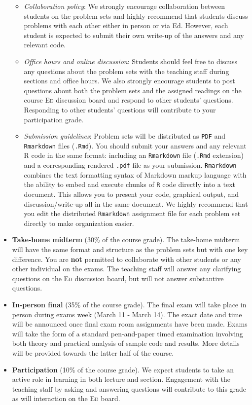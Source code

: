 \documentclass[11pt, article, oneside]{memoir}
\theoremstyle{Assumption}
\begin{document}
\begin{itemize}
\begin{itemize}
       \item \textit{Collaboration policy}: We strongly encourage collaboration between students on the problem sets and highly recommend that students discuss problems with each other either in person or via Ed. However, each student is expected to submit their own write-up of the answers and any relevant code. 
        \item \textit{Office hours and online discussion}: Students should feel free to discuss any questions about the problem sets with the teaching staff during sections and office hours. We also strongly encourage students to post questions about both the problem sets and the assigned readings on the course \textsc{Ed} discussion board and respond to other students’ questions. Responding to other students’ questions will contribute to your participation grade.
        \item \textit{Submission guidelines}: Problem sets will be distributed as \texttt{PDF} and \texttt{Rmarkdown} files (\texttt{.Rmd}). You should submit your answers and any relevant R code in the same format: including an \texttt{Rmarkdown} file (\texttt{.Rmd} extension) and a corresponding rendered \texttt{.pdf} file as your submission. \texttt{Rmarkdown} combines the text formatting syntax of Markdown markup language with the ability to embed and execute chunks of \texttt{R} code directly into a text document. This allows you to present your code, graphical output, and discussion/write-up all in the same document. We highly recommend that you edit the distributed \texttt{Rmarkdown} assignment file for each problem set directly to make organization easier.
        \end{itemize}
\item  \textbf{Take-home midterm} (30\% of the course grade). The take-home midterm will have the same format and structure as the problem sets but with one key difference. You are \textbf{not} permitted to collaborate with other students or any other individual on the exams. The teaching staff will answer any clarifying questions on the \textsc{Ed} discussion board, but will not answer substantive questions.
\item \textbf{In-person final} (35\% of the course grade). The final exam will take place in person during exams week (March 11 - March 14). The exact date and time will be announced once final exam room assignments have been made. Exams will take the form of a standard pen-and-paper timed examination involving both theory and practical analysis of sample code and results. More details will be provided towards the latter half of the course.
    \item \textbf{Participation} (10\% of the course grade). We expect students to take an active role in learning in both lecture and section. Engagement with the teaching staff by asking and answering questions will contribute to this grade as will interaction on the \textsc{Ed} board.
\end{itemize}
\end{document}
